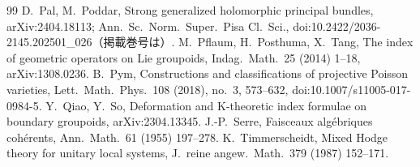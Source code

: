 \begin{thebibliography}{99}
 D.\ Pal, M.\ Poddar, Strong generalized holomorphic principal bundles, arXiv:2404.18113; Ann.\ Sc.\ Norm.\ Super.\ Pisa Cl.\ Sci., doi:10.2422/2036-2145.202501\_026（掲載巻号は\tQ）.
 M.\ Pflaum, H.\ Posthuma, X.\ Tang, The index of geometric operators on Lie groupoids, Indag.\ Math.\ 25 (2014) 1--18, arXiv:1308.0236.
 B.\ Pym, Constructions and classifications of projective Poisson varieties, Lett.\ Math.\ Phys.\ 108 (2018), no.\ 3, 573--632, doi:10.1007/s11005-017-0984-5.
 Y.\ Qiao, Y.\ So, Deformation and K-theoretic index formulae on boundary groupoids, arXiv:2304.13345.
 J.-P.\ Serre, Faisceaux alg\'ebriques coh\'erents, Ann.\ Math.\ 61 (1955) 197--278.
 K.\ Timmerscheidt, Mixed Hodge theory for unitary local systems, J.\ reine angew.\ Math.\ 379 (1987) 152--171.
\end{thebibliography}
